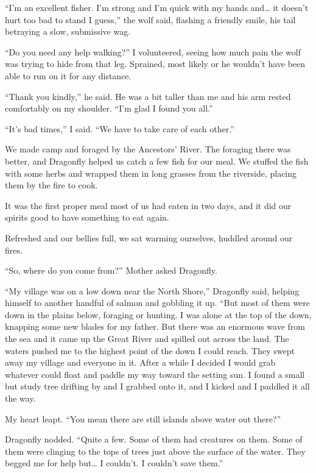 ``I'm an excellent fisher. I'm strong and I'm quick with my hands and\ldots{} it doesn't hurt too bad to stand I guess,'' the wolf said, flashing a friendly smile, his tail betraying a slow, submissive wag.

``Do you need any help walking?'' I volunteered, seeing how much pain the wolf was trying to hide from that leg. Sprained, most likely or he wouldn't have been able to run on it for any distance.

``Thank you kindly,'' he said. He was a bit taller than me and his arm rested comfortably on my shoulder. ``I'm glad I found you all.''

``It's bad times,'' I said. ``We have to take care of each other.''

\secdiv

We made camp and foraged by the Ancestors' River. The foraging there was better, and Dragonfly helped us catch a few fish for our meal. We stuffed the fish with some herbs and wrapped them in long grasses from the riverside, placing them by the fire to cook.

It was the first proper meal most of us had eaten in two days, and it did our spirits good to have something to eat again.

Refreshed and our bellies full, we sat warming ourselves, huddled around our fires.

``So, where do you come from?'' Mother asked Dragonfly.

``My village was on a low down near the North Shore,'' Dragonfly said, helping himself to another handful of salmon and gobbling it up. ``But most of them were down in the plains below, foraging or hunting. I was alone at the top of the down, knapping some new blades for my father. But there was an enormous wave from the sea and it came up the Great River and spilled out across the land. The waters pushed me to the highest point of the down I could reach. They swept away my village and everyone in it. After a while I decided I would grab whatever could float and paddle my way toward the setting sun. I found a small but study tree drifting by and I grabbed onto it, and I kicked and I paddled it all the way.

My heart leapt. ``You mean there are still islands above water out there?''

Dragonfly nodded. ``Quite a few. Some of them had creatures on them. Some of them were clinging to the tops of trees just above the surface of the water. They begged me for help but\ldots{} I couldn't. I couldn't save them.''

